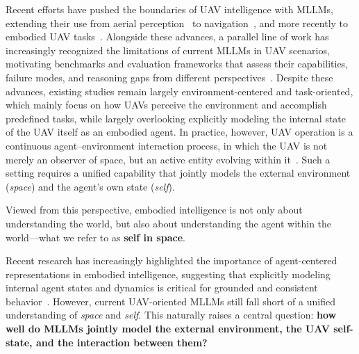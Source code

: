 \documentclass[sigconf, screen, review, anonymous]{acmart}
\begin{document}
Recent efforts have pushed the boundaries of UAV intelligence with MLLMs, extending their use from aerial perception~\cite{liu2024remoteclip,wang2024skyscript} to navigation~\cite{wang2024towards,xu2025aerial}, and more recently to embodied UAV tasks~\cite{gao2025openfly,liu2026indooruav}. Alongside these advances, a parallel line of work has increasingly recognized the limitations of current MLLMs in UAV scenarios, motivating benchmarks and evaluation frameworks that assess their capabilities, failure modes, and reasoning gaps from different perspectives~\cite{UrbanVideo-Bench,UAVScenes,MM-UAVBench}. Despite these advances, existing studies remain largely environment-centered and task-oriented, which mainly focus on how UAVs perceive the environment and accomplish predefined tasks, while largely overlooking explicitly modeling the internal state of the UAV itself as an embodied agent. In practice, however, UAV operation is a continuous agent--environment interaction process, in which the UAV is not merely an observer of space, but an active entity evolving within it~\cite{zhang2025mllms,montello1993scale}. Such a setting requires a unified capability that jointly models the external environment (\emph{space}) and the agent’s own state (\emph{self}).



Viewed from this perspective, embodied intelligence is not only about understanding the world, but also about understanding the agent within the world---what we refer to as \textbf{self in space}.

Recent research has increasingly highlighted the importance of agent-centered representations in embodied intelligence, suggesting that explicitly modeling internal agent states and dynamics is critical for grounded and consistent behavior~\cite{DeconstructingSpatialIntelligence,kadambi2025embodiment,li2024embodied}. However, current UAV-oriented MLLMs still fall short of a unified understanding of \emph{space} and \emph{self}. This naturally raises a central question: \textbf{how well do MLLMs jointly model the external environment, the UAV self-state, and the interaction between them?}
\end{document}
